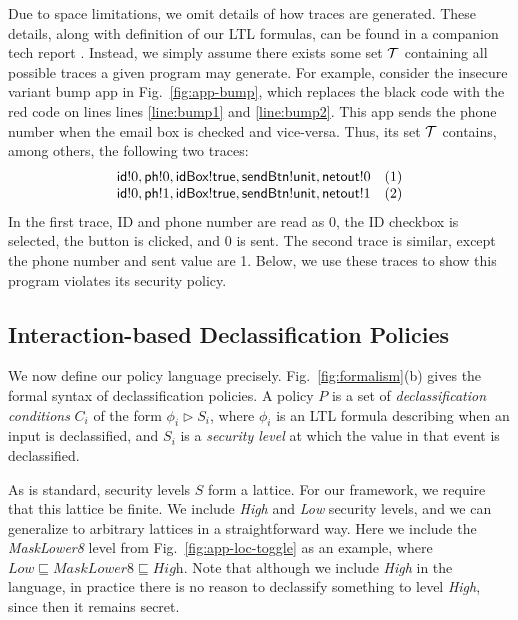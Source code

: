Due to space limitations, we omit details of how traces are
generated.  These details, along with definition of our LTL 
formulas, can be found in a companion tech report \cite{Micinski:2015}.
Instead, we simply assume there exists some set
$\mathcal{T}$ containing all possible traces a given program may
generate.
For example, consider the insecure variant bump app in
Fig.~\ref{fig:app-bump}, which replaces the black code with the red
code on lines lines \ref{line:bump1}
and \ref{line:bump2}.  This app sends the phone number when the
email box is checked and vice-versa. Thus, its set $\mathcal{T}$
contains, among others, the following two traces:
\begin{displaymath}
  \begin{array}{cl}
    \textsf{id}!0, \textsf{ph}!0, \textsf{idBox}!\textsf{true},
    \textsf{sendBtn}!\textsf{unit}, \textsf{netout}!0 & (1) \\
    \textsf{id}!0, \textsf{ph}!1, \textsf{idBox}!\textsf{true},
    \textsf{sendBtn}!\textsf{unit}, \textsf{netout}!1 & (2) \\
  \end{array}
\end{displaymath}%
\lstset{language=Java}%
In the first trace, ID and phone number are read as 0, the
ID checkbox is selected, the button is clicked, and 0 is sent.
The second trace is similar, except the phone number and sent value
are 1. Below, we use these traces to show this program
violates its security policy.

\subsection{Interaction-based Declassification Policies}
\label{sec:policies}

We now define our policy language precisely.
Fig.~\ref{fig:formalism}(b) gives the formal syntax of
declassification policies.  A policy $P$ is a set of
\emph{declassification conditions} $C_i$ of the form $\phi_i\rhd S_i$,
where $\phi_i$ is an LTL formula describing when an input is
declassified, and $S_i$ is a \emph{security level} at which the value
in that event is declassified.

As is standard, security levels $S$ form a lattice.  For our
framework, we require that this lattice be finite.  We include
\textit{High} and \textit{Low} security levels, and we can generalize
to arbitrary lattices in a straightforward way. Here we include the
\textit{MaskLower8} level from Fig.~\ref{fig:app-loc-toggle} as an
example, where $\textit{Low} \sqsubseteq \textit{MaskLower8}
\sqsubseteq \textit{High}$.  Note that although we include
\textit{High} in the language, in practice there is no reason to
declassify something to level \textit{High}, since then it remains
secret.

